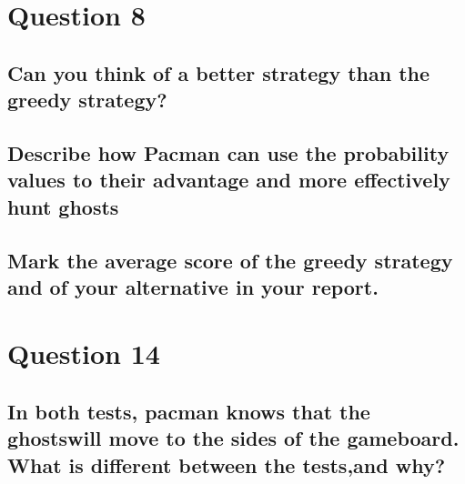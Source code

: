 \documentclass[11pt]{article}
\begin{document}
\section*{Question 8}
\subsection*{Can you think of a better strategy than the greedy strategy?}

\subsection*{Describe how Pacman can use the probability values to their advantage and more effectively hunt ghosts}

\subsection*{Mark the average score of the greedy strategy and of your alternative in your report.}

\section*{Question 14}
\subsection*{In both tests, pacman knows that the ghostswill move to the sides of the gameboard. What is different between the tests,and why?}
\end{document}
